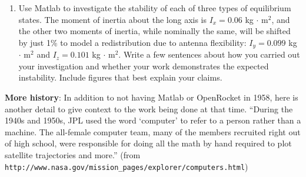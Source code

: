 \documentclass[12pt,letterpaper]{hmcpset}
\begin{document}
\begin{problem}[3]
\begin{enumerate}
			\item Use Matlab to investigate the stability of each of three types of equilibrium states.
			The moment of inertia about the long axis is $I_x = 0.06$ kg $\cdot$ m$^2$, and the other two
			moments of inertia, while nominally the same, will be shifted by just 1\% to model a
			redistribution due to antenna flexibility: $I_y = 0.099$ kg $\cdot$ m$^2$ and $I_z = 0.101$ kg $\cdot$ m$^2$. Write
			a few sentences about how you carried out your investigation and whether your work
			demonstrates the expected instability. Include figures that best explain your claims.
		\end{enumerate}
	\end{problem}
	
	\newpage
	
	\begin{problem}[3 (cont.)]
		\textbf{More history}: In addition to not having Matlab or OpenRocket in 1958, here is another
		detail to give context to the work being done at that time. ``During the 1940s and 1950s,
		JPL used the word `computer' to refer to a person rather than a machine. The all-female
		computer team, many of the members recruited right out of high school, were responsible
		for doing all the math by hand required to plot satellite trajectories and more.'' (from
		\texttt{http://www.nasa.gov/mission\_pages/explorer/computers.html})
	\end{problem}
	
	
\end{document}
